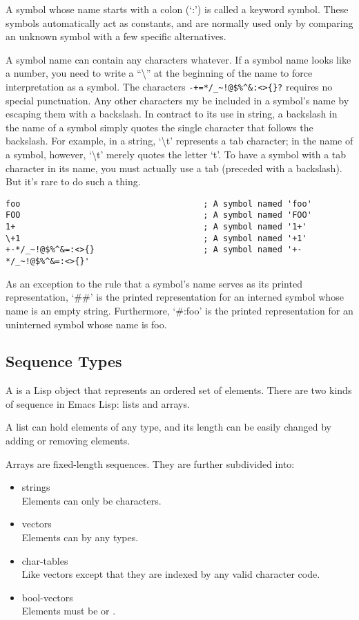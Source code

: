 A symbol whose name starts with a colon (‘:’) is called a keyword symbol.
These symbols automatically act as constants, and are normally used only by comparing an unknown symbol with a few specific alternatives.

A symbol name can contain any characters whatever.
If a symbol name looks like a number, you need to write a ``\textbackslash{}'' at the beginning of the name to force interpretation as a symbol.
The characters \lstinline|-+=*/_~!@$%^&:<>{}?| requires no special punctuation.
Any other characters my be included in a symbol's name by escaping them with a backslash.
In contract to its use in string, a backslash in the name of a symbol simply quotes the single character that follows the backslash.
For example, in a string, ‘\textbackslash{}t’ represents a tab character; in the name of a symbol, however, ‘\textbackslash{}t’ merely quotes the letter ‘t’.
To have a symbol with a tab character in its name, you must actually use a tab (preceded with a backslash).
But it’s rare to do such a thing.

\begin{lstlisting}
foo                                     ; A symbol named 'foo'
FOO                                     ; A symbol named 'FOO'
1+                                      ; A symbol named '1+'
\+1                                     ; A symbol named '+1'
+-*/_~!@$%^&=:<>{}                      ; A symbol named '+-*/_~!@$%^&=:<>{}'

\end{lstlisting}


As an exception to the rule that a symbol’s name serves as its printed representation, ‘\#\#’ is the printed representation for an interned symbol whose name is an empty string.
Furthermore, ‘\#:foo’ is the printed representation for an uninterned symbol whose name is foo.

\subsection{Sequence Types}
\label{sec:sequence-types}


A  is a Lisp object that represents an ordered set of elements.
There are two kinds of sequence in Emacs Lisp: lists and arrays.


A list can hold elements of any type, and its length can be easily changed by adding or removing elements.

Arrays are fixed-length sequences.
They are further subdivided into:
\begin{itemize}
\item strings\\
   Elements can only be characters.
\item vectors \\
  Elements can by any types.
\item char-tables\\
  Like vectors except that they are indexed by any valid character code.
\item bool-vectors\\
  Elements must be  or .  
\end{itemize}

